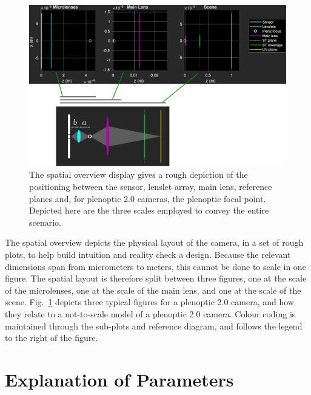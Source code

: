\documentclass[onecolumn]{article}
\begin{document}
\begin{figure}
	\centering
	\includegraphics[width=1\textwidth]{Figs/SpatialOverview}
	\caption{The spatial overview display gives a rough depiction of the positioning between the sensor, lenslet array, main lens, reference planes and, for plenoptic 2.0 cameras, the plenoptic focal point. Depicted here are the three scales employed to convey the entire scenario.}
	\label{fig_SpatialOverview}
\end{figure}

The spatial overview depicts the physical layout of the camera, in a set of rough plots, to help build intuition and reality check a design.  Because the relevant dimensions span from micrometers to meters, this cannot be done to scale in one figure.  The spatial layout is therefore split between three figures, one at the scale of the microlenses, one at the scale of the main lens, and one at the scale of the scene.  Fig.~\ref{fig_SpatialOverview} depicts three typical figures for a plenoptic 2.0 camera, and how they relate to a not-to-scale model of a plenoptic 2.0 camera. Colour coding is maintained through the sub-plots and reference diagram, and follows the legend to the right of the figure.

\section{Explanation of Parameters}
\end{document}
